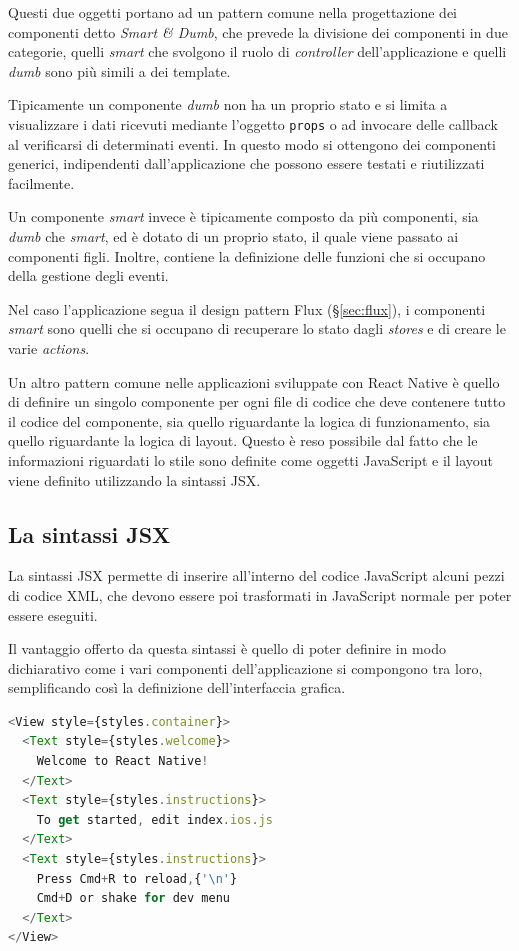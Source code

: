 Questi due oggetti portano ad un pattern comune nella progettazione dei componenti detto \textit{Smart \& Dumb}, che prevede la divisione dei componenti in due categorie, quelli \textit{smart} che svolgono il ruolo di \textit{controller} dell'applicazione e quelli \textit{dumb} sono più simili a dei template.

Tipicamente un componente \textit{dumb} non ha un proprio stato e si limita a visualizzare i dati ricevuti mediante l'oggetto \texttt{props} o ad invocare delle callback al verificarsi di determinati eventi. In questo modo si ottengono dei componenti generici, indipendenti dall'applicazione che possono essere testati e riutilizzati facilmente.

Un componente \textit{smart} invece è tipicamente composto da più componenti, sia \textit{dumb} che \textit{smart}, ed è dotato di un proprio stato, il quale viene passato ai componenti figli. Inoltre, contiene la definizione delle funzioni che si occupano della gestione degli eventi.

Nel caso l'applicazione segua il design pattern Flux (§\ref{sec:flux}), i componenti \textit{smart} sono quelli che si occupano di recuperare lo stato dagli \textit{stores} e di creare le varie \textit{actions}.

Un altro pattern comune nelle applicazioni sviluppate con React Native è quello di definire un singolo componente per ogni file di codice che deve contenere tutto il codice del componente, sia quello riguardante la logica di funzionamento, sia quello riguardante la logica di layout.
Questo è reso possibile dal fatto che le informazioni riguardati lo stile sono definite come oggetti JavaScript e il layout viene definito utilizzando la sintassi JSX.

\subsection{La sintassi JSX}

La sintassi JSX permette di inserire all'interno del codice JavaScript alcuni pezzi di codice XML, che devono essere poi trasformati in JavaScript normale per poter essere eseguiti.

Il vantaggio offerto da questa sintassi è quello di poter definire in modo dichiarativo come i vari componenti dell'applicazione si compongono tra loro, semplificando così la definizione dell'interfaccia grafica.

\begin{lstlisting}[language=JavaScript, caption=Esempio della sintassi JSX di React Native]
<View style={styles.container}>
  <Text style={styles.welcome}>
    Welcome to React Native!
  </Text>
  <Text style={styles.instructions}>
    To get started, edit index.ios.js
  </Text>
  <Text style={styles.instructions}>
    Press Cmd+R to reload,{'\n'}
    Cmd+D or shake for dev menu
  </Text>
</View>
\end{lstlisting}


